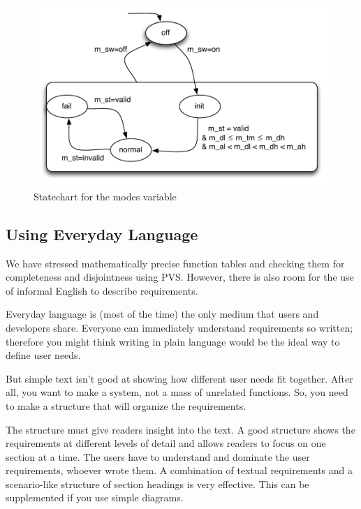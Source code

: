 \begin{figure}[!htb]
\begin{mdframed}
\begin{center}
\includegraphics[width=.9\textwidth]{pics/mode-statechart.pdf}
\end{center}
\end{mdframed}
\caption{Statechart for the modes variable }
\label{fig:sc}
\end{figure}

\subsection{Using Everyday Language}
We have stressed mathematically precise function tables and checking them for completeness and disjointness using PVS. However, there is also room for the use of informal English to describe requirements.

Everyday language is (most of the time) the only medium that users and developers share. Everyone
can immediately understand requirements so written; therefore you might think
writing in plain language would be the ideal way to define user needs. 

But simple
text isn't good at showing how different user needs fit together. After all, you
want to make a system, not a mass of unrelated functions. So, you need to make
a structure that will organize the requirements.

The structure must give readers insight into the text. A good structure shows the
requirements at different levels of detail and allows readers to focus on one
section at a time. The users have to understand and dominate the user
requirements, whoever wrote them. A combination of textual requirements and a
scenario-like structure of section headings is very effective. This can be
supplemented if you use simple diagrams.

